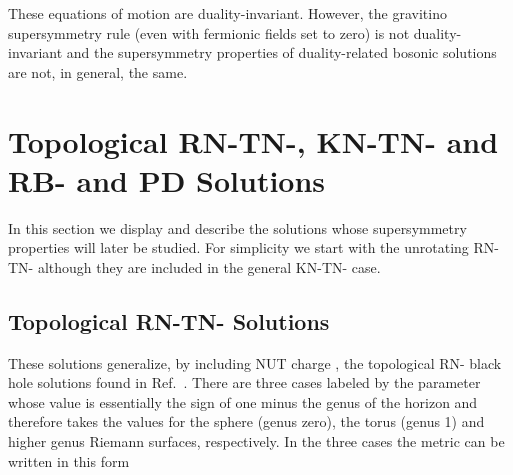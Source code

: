 \documentclass[12pt,a4paper]{article}
\begin{document}
These equations of motion are duality-invariant. However, the
gravitino supersymmetry rule (even with fermionic fields set to zero)
is not duality-invariant and the supersymmetry properties of
duality-related bosonic solutions are not, in general, the same.



\section{Topological RN-TN-\coordHE{}, KN-TN-\coordHE{} and 
RB-\coordHE{} and PD Solutions}
\label{sec-solutions}

In this section we display and describe the solutions whose
supersymmetry properties will later be studied.  For simplicity we
start with the unrotating RN-TN-\coordHE{} although they are included in
the general KN-TN-\coordHE{} case.


\subsection{Topological RN-TN-\coordHE{} Solutions}

These solutions generalize, by including NUT charge \coordHE{}, the
topological RN-\coordHE{} black hole solutions found in Ref.~\cite{art:BLP}.
There are three cases labeled by the parameter \myHighlight{$\aleph$}\coordHE{} whose value is
essentially the sign of one minus the genus of the horizon and
therefore takes the values \coordHE{} for the sphere (genus zero), the
torus (genus 1) and higher genus Riemann surfaces, respectively.  In
the three cases the metric can be written in this form
\end{document}
